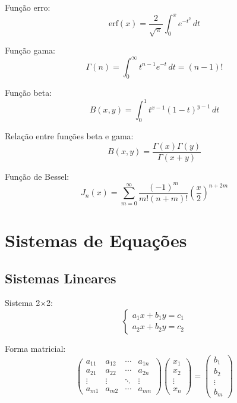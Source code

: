 Função erro:
\begin{equation}
\text{erf}(x) = \frac{2}{\sqrt{\pi}}\int_0^x e^{-t^2}\,dt
\end{equation}

Função gama:
\begin{equation}
\Gamma(n) = \int_0^{\infty} t^{n-1}e^{-t}\,dt = (n-1)!
\end{equation}

Função beta:
\begin{equation}
B(x,y) = \int_0^1 t^{x-1}(1-t)^{y-1}\,dt
\end{equation}

Relação entre funções beta e gama:
\begin{equation}
B(x,y) = \frac{\Gamma(x)\Gamma(y)}{\Gamma(x+y)}
\end{equation}

Função de Bessel:
\begin{equation}
J_n(x) = \sum_{m=0}^{\infty} \frac{(-1)^m}{m!(n+m)!}\left(\frac{x}{2}\right)^{n+2m}
\end{equation}


\section{Sistemas de Equações}

\subsection{Sistemas Lineares}

Sistema 2×2:
\begin{equation}
\begin{cases}
a_1x + b_1y = c_1 \\
a_2x + b_2y = c_2
\end{cases}
\end{equation}

Forma matricial:
\begin{equation}
\begin{pmatrix}
a_{11} & a_{12} & \cdots & a_{1n} \\
a_{21} & a_{22} & \cdots & a_{2n} \\
\vdots & \vdots & \ddots & \vdots \\
a_{m1} & a_{m2} & \cdots & a_{mn}
\end{pmatrix}
\begin{pmatrix}
x_1 \\ x_2 \\ \vdots \\ x_n
\end{pmatrix}
=
\begin{pmatrix}
b_1 \\ b_2 \\ \vdots \\ b_m
\end{pmatrix}
\end{equation}

